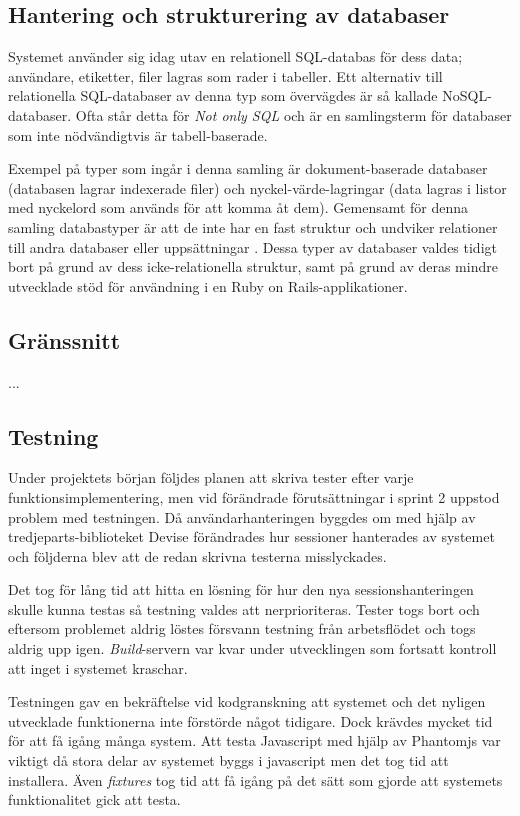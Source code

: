 \subsection{Hantering och strukturering av databaser}

Systemet använder sig idag utav en relationell SQL-databas för dess data; användare, etiketter, filer lagras som rader i tabeller. Ett alternativ till relationella SQL-databaser av denna typ som övervägdes är så kallade NoSQL-databaser. Ofta står detta för \emph{Not only SQL} \cite{nosql} och är en samlingsterm för databaser som inte nödvändigtvis är tabell-baserade.

Exempel på typer som ingår i denna samling är dokument-baserade databaser (databasen lagrar indexerade filer) och nyckel-värde-lagringar (data lagras i listor med nyckelord som används för att komma åt dem). Gemensamt för denna samling databastyper är att de inte har en fast struktur och undviker relationer till andra databaser eller uppsättningar \cite{largedata}. Dessa typer av databaser valdes tidigt bort på grund av dess icke-relationella struktur, samt på grund av deras mindre utvecklade stöd för användning i en Ruby on Rails-applikationer.

\subsection{Gränssnitt}

...

\subsection{Testning}

Under projektets början följdes planen att skriva tester efter varje funktionsimplementering, men vid förändrade förutsättningar i sprint 2 uppstod problem med testningen. Då användarhanteringen byggdes om med hjälp av tredjeparts-biblioteket Devise förändrades hur sessioner hanterades av systemet och följderna blev att de redan skrivna testerna misslyckades.

Det tog för lång tid att hitta en lösning för hur den nya sessionshanteringen skulle kunna testas så testning valdes att nerprioriteras. Tester togs bort och eftersom problemet aldrig löstes försvann testning från arbetsflödet och togs aldrig upp igen. \emph{Build}-servern var kvar under utvecklingen som fortsatt kontroll att inget i systemet kraschar.

Testningen gav en bekräftelse vid kodgranskning att systemet och det nyligen utvecklade funktionerna inte förstörde något tidigare. Dock krävdes mycket tid för att få igång många system. Att testa Javascript med hjälp av Phantomjs var viktigt då stora delar av systemet byggs i javascript men det tog tid att installera. Även \emph{fixtures} tog tid att få igång på det sätt som gjorde att systemets funktionalitet gick att testa.

